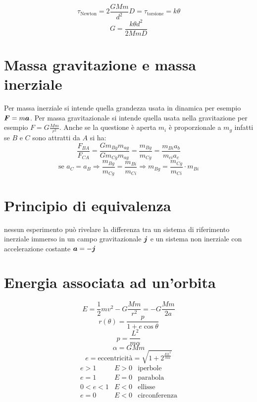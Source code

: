 \begin{equation*}\tau_\text{Newton}=2\frac{GMm}{d^2}D=\tau_\text{torsione}=k\theta\end{equation*}
\begin{equation*}G=\frac{k\theta d^2}{2MmD}\end{equation*}
\section{Massa gravitazione e massa inerziale}
Per massa inerziale si intende quella grandezza usata in dinamica
per esempio \mbox{$\boldsymbol{F}=m\boldsymbol{a}$}. Per massa gravitazionale si intende quella usata nella gravitazione per esempio $F=G\frac{Mm}{r^2}$. Anche se la questione è aperta $m_i$ è proporzionale a $m_g$ infatti se $B$ e $C$ sono attratti da $A$ si ha:
\begin{equation*}\frac{F_{BA}}{F_{CA}}=\frac{Gm_{Bg}m_{ag}}{Gm_{Cg}m_{ag}}=\frac{m_{Bg}}{m_{Cg}}=\frac{m_{Bi}a_b}{m_{ci}a_c}\end{equation*}
$$\text{se }a_C=a_B\Rightarrow\frac{m_{Bg}}{m_{Cg}}=\frac{m_{Bi}}{m_{Ci}}\Rightarrow
m_{Bg}=\frac{m_{Cg}}{m_{Ci}}\cdot m_{Bi}$$
\section{Principio di equivalenza}
\begin{Pri}
nessun esperimento può rivelare la differenza tra un sistema di riferimento inerziale immerso in un campo gravitazionale $\boldsymbol{j}$ e un sistema non inerziale con accelerazione costante $\boldsymbol{a}=-\boldsymbol{j}$
\end{Pri}
\section{Energia associata ad un'orbita}
\begin{equation*}E=\frac{1}{2}mv^2-G\frac{Mm}{r^2}=-G\frac{Mm}{2a}\end{equation*}
\begin{equation*}r(\theta)=\frac{p}{1+e\cos\theta}\end{equation*}
\begin{equation*}p=\frac{L^2}{m\alpha}\end{equation*}
\begin{equation*}\alpha=GMm\end{equation*}
\begin{equation*}e=\text{eccentricità}=\sqrt{1+2^{\frac{EL^2}{m\alpha}}}\end{equation*}
$$\begin{array}{llc}
e>1&E>0&\text{iperbole}\\
e=1&E=0&\text{parabola}\\
0<e<1&E<0&\text{ellisse}\\
e=0&E<0&\text{circonferenza}\\
\end{array}$$
